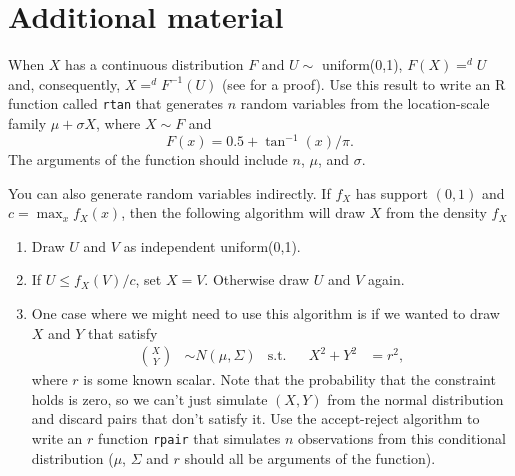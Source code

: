 

\section{Additional material}

\begin{hw}
  When $X$ has a continuous distribution $F$ and $U \sim$
  uniform(0,1), $F(X) =^d U$ and, consequently, $X =^d F^{-1}(U)$ (see
  \citealt[Theorem 2.1.10]{CB02} for a proof). Use this result to
  write an R function called \texttt{rtan} that generates $n$ random
  variables from the location-scale family $\mu + \sigma X$, where $X
  \sim F$ and
  \begin{equation*}
    F(x) = 0.5 + \tan^{-1}(x)/\pi.
  \end{equation*}
  The arguments of the function should include $n$, $\mu$, and $\sigma$.
\end{hw}

\begin{hw}
  You can also generate random variables indirectly. If $f_X$ has
  support $(0,1)$ and $c = \max_x f_X(x)$, then the following
  algorithm will draw $X$ from the density $f_X$ \citep[see][Section
  5.6.2]{CB02}
  \begin{enumerate}
  \item Draw $U$ and $V$ as independent uniform(0,1).
  \item If $U \leq f_X(V) / c$, set $X = V$. Otherwise draw $U$ and $V$
    again.
  \item One case where we might need to use this algorithm is if we
    wanted to draw $X$ and $Y$ that satisfy
    \begin{align*}
      \binom{X}{Y} &\sim N(\mu,\Sigma) & \text{s.t.}&& X^2 + Y^2 &= r^2,
    \end{align*}
    where $r$ is some known scalar. Note that the probability that
    the constraint holds is zero, so we can't just simulate $(X,Y)$
    from the normal distribution and discard pairs that don't satisfy
    it. Use the accept-reject algorithm to write an $r$ function
    \texttt{rpair} that simulates $n$ observations from this
    conditional distribution ($\mu$, $\Sigma$ and $r$ should all be arguments
    of the function).
  \end{enumerate}
\end{hw}

